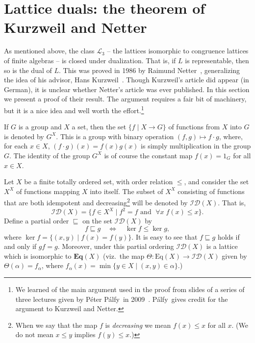 \documentclass[cm,dissertation]{uhthesis}
\theoremstyle{plain}
\theoremstyle{definition}
\theoremstyle{remark}
\numberwithin{theorem}{section}
\numberwithin{claim}{chapter}
\numberwithin{equation}{section}
\numberwithin{conjecture}{chapter}
\newcommand{\Palfy}{P\'alfy}
\newcommand{\<}{\ensuremath{\langle}}
\renewcommand{\>}{\ensuremath{\rangle}}
\renewcommand{\leq}{\ensuremath{\leqslant}}
\newcommand{\ID}[1]{\ensuremath{\mathcal{ID}(#1)}}
\newcommand{\EqX}{\ensuremath{\mbox{Eq}(X)}}
\newcommand{\bEqX}{\ensuremath{\mathbf{Eq}(X)}}
\newcommand{\0}{\ensuremath{\mathbf{0}}}
\newcommand{\1}{\ensuremath{\mathbf{1}}}
\newcommand{\2}{\ensuremath{\mathbf{2}}}
\newcommand{\3}{\ensuremath{\mathbf{3}}}
\newcommand{\4}{\ensuremath{\mathbf{4}}}
\newcommand{\5}{\ensuremath{\mathbf{5}}}
\newcommand{\sL}{\ensuremath{\mathscr{L}}}
\begin{document}
\section{Lattice duals: the theorem of Kurzweil and Netter}
\label{sec:duals-interv-subl-detail}
As mentioned above, 
the class $\sL_3$ -- the lattices isomorphic to congruence lattices of finite
algebras -- is closed under
dualization.
That is, if $L$ is representable, then so is the dual of $L$. This was proved in
%
1986 by Raimund Netter~\cite{Netter:1986}, generalizing the idea of his advisor,
%
Hans Kurzweil~\cite{Kurzweil:1985}. 
Though Kurzweil's article did appear (in German), it is unclear whether Netter's
article was ever published.
In this section we present a proof of their result.
The argument requires a fair bit of machinery, but it is a nice idea and
well worth the effort.\footnote{We learned 
  of the main argument used in the proof from slides of a series of three
%
  lectures given by P{\'e}ter \Palfy\ in 2009~\cite{Palfy:2009}.
  \Palfy\ gives credit for the argument to Kurzweil and Netter.} 

If $G$ is a group and $X$ a set, then the set $\{f \mid X\rightarrow G\}$ of 
functions from $X$ into $G$ is denoted by $G^X$.  This is a group with binary
operation $(f,g) \mapsto f\cdot g$, where,  
for each $x\in X$, $(f\cdot g)(x)= f(x)g(x)$ is simply multiplication
in the group $G$.  The identity of the group $G^X$ is of course the constant map $f(x) =
1_G$ for all $x\in X$.

Let $X$ be a finite totally ordered set, with order relation $\leq$,
and consider the set $X^X$ of functions mapping $X$ into itself.  
The subset of $X^X$ consisting of functions that are both idempotent and
decreasing\footnote{When we say that the map $f$ is \emph{decreasing} we mean
  $f(x)\leq x$ for all $x$. (We do not mean $x\leq y$ implies $f(y) \leq x$.)}
 will be denoted by $\ID{X}$.  That is,
\[
\ID{X} = \{f\in X^X \mid f^2 = f \text{ and }\; \forall x\; f(x) \leq x\}.
\]
Define a partial order $\sqsubseteq$ on the set $\ID{X}$ by
\begin{equation}
  \label{eq:MID111}
 f\sqsubseteq g \quad \Leftrightarrow \quad \ker f \leq \ker g,
\end{equation}
where $\ker f = \{(x,y) \mid f(x) = f(y)\}$.
It is easy to see that $f\sqsubseteq g$ holds if and only if $gf = g$.  
Moreover, under this partial ordering $\ID{X}$ is a lattice which is 
isomorphic to $\bEqX$ (viz.~the map $\Theta : \EqX \rightarrow
\ID{X}$ given by $\Theta(\alpha) = f_\alpha$, where
$f_\alpha(x) = \min\{y\in X \mid (x,y)\in \alpha\}$.) %
\end{document}
